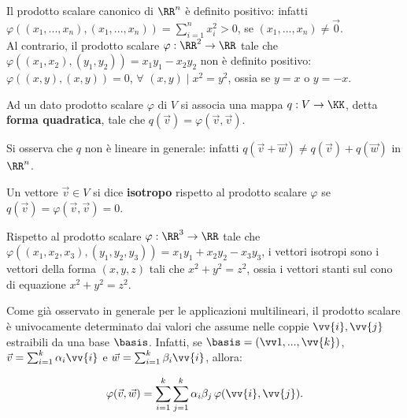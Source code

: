 \documentclass[11pt]{article}
\begin{document}
	\begin{example}
		Il prodotto scalare canonico di $\RR^n$ è definito positivo: infatti $\varphi((x_1, ..., x_n), (x_1, ..., x_n)) =
		\sum_{i=1}^n x_i^2  > 0$, se $(x_1, ..., x_n) \neq \vec 0$. \\
		
		Al contrario, il prodotto scalare $\varphi : \RR^2 \to \RR$ tale che $\varphi((x_1, x_2), (y_1, y_2)) = x_1 y_1 - x_2 y_2$ non è definito positivo: $\varphi((x, y), (x, y)) = 0$, $\forall$ $(x, y) \mid x^2 = y^2$, ossia se
		$y = x$ o $y = -x$.
	\end{example}

	\begin{definition}
		Ad un dato prodotto scalare $\varphi$ di $V$ si associa una mappa
		$q : V \to \KK$, detta \textbf{forma quadratica}, tale che $q(\vec{v}) = \varphi(\vec{v}, \vec{v})$.
	\end{definition}

	\begin{remark}
		Si osserva che $q$ non è lineare in generale: infatti $q(\vec{v} + \vec{w}) \neq q(\vec{v}) + q(\vec{w})$ in
		$\RR^n$.
	\end{remark}

	\begin{definition}
		Un vettore $\vec{v} \in V$ si dice \textbf{isotropo} rispetto al prodotto scalare $\varphi$ se $q(\vec{v}) =
		\varphi(\vec{v}, \vec{v}) = 0$.
	\end{definition}

	\begin{example}
		Rispetto al prodotto scalare $\varphi : \RR^3 \to \RR$ tale che $\varphi((x_1, x_2, x_3), (y_1, y_2, y_3)) =
		x_1 y_1 + x_2 y_2 - x_3 y_3$, i vettori isotropi sono i vettori della forma $(x, y, z)$ tali che $x^2 + y^2 = z^2$, ossia
		i vettori stanti sul cono di equazione $x^2 + y^2 = z^2$.
	\end{example}

	\begin{remark}
		Come già osservato in generale per le applicazioni multilineari, il prodotto scalare è univocamente determinato
		dai valori che assume nelle coppie $\vv{i}, \vv{j}$ estraibili da una base $\basis$. Infatti, se
		$\basis = (\vv1, ..., \vv{k})$, $\vec{v} = \sum_{i=1}^k \alpha_i \vv{i}$ e $\vec{w} = \sum_{i=1}^k \beta_i \vv{i}$,
		allora:
		
		\[ \varphi(\vec{v}, \vec{w}) = \sum_{i=1}^k \sum_{j=1}^k \alpha_i \beta_j \, \varphi(\vv{i}, \vv{j}). \]
	\end{remark}
\end{document}
